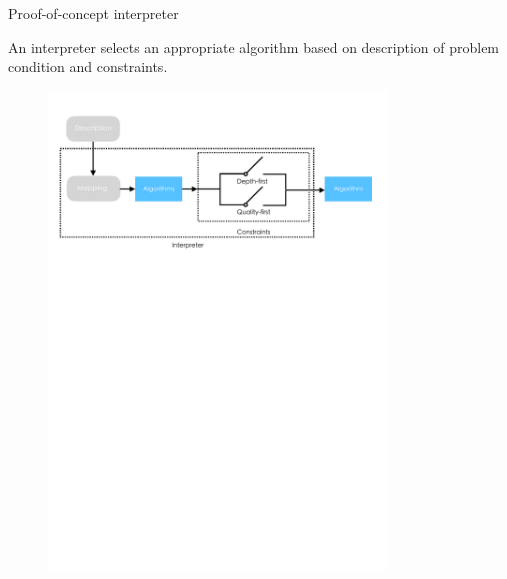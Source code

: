 \documentclass[10pt]{beamer}
\begin{document}
\begin{frame}{Proof-of-concept interpreter}

An interpreter selects an appropriate algorithm based on description of problem condition and constraints.

\begin{figure}[!htbp]
\centering
\includegraphics[width=0.8\textwidth]{interp/interpreter.pdf}
\end{figure}

\end{frame}
\end{document}
